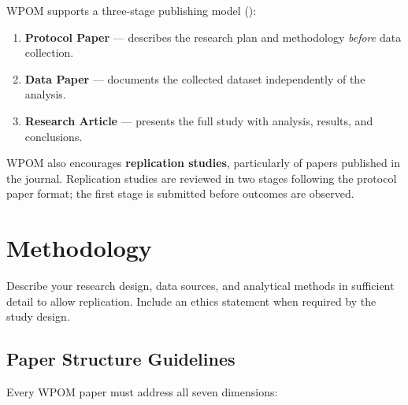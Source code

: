 \documentclass{wpom-upv}
\begin{document}
WPOM supports a three-stage publishing model
(\textcite{maringarcia2021three}):

\begin{enumerate}
  \item \textbf{Protocol Paper} — describes the research plan and
    methodology \emph{before} data collection.
  \item \textbf{Data Paper} — documents the collected dataset
    independently of the analysis.
  \item \textbf{Research Article} — presents the full study with
    analysis, results, and conclusions.
\end{enumerate}

WPOM also encourages \textbf{replication studies}, particularly of
papers published in the journal. Replication studies are reviewed in
two stages following the protocol paper format; the first stage is
submitted before outcomes are observed.


\section{Methodology}


Describe your research design, data sources, and analytical methods in
sufficient detail to allow replication. Include an ethics statement
when required by the study design.

\subsection{Paper Structure Guidelines}

Every WPOM paper must address all seven dimensions:
\end{document}
